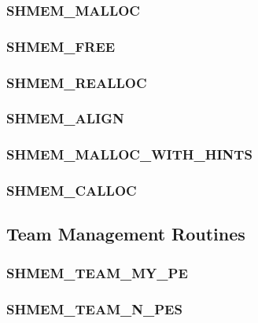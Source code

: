 \documentclass[10pt,oneside]{book}
\begin{document}
\subsubsection{\textbf{SHMEM\_MALLOC}}\label{subsec:shmem_malloc}


\subsubsection{\textbf{SHMEM\_FREE}}\label{subsec:shmem_free}


\subsubsection{\textbf{SHMEM\_REALLOC}}\label{subsec:shmem_realloc}


\subsubsection{\textbf{SHMEM\_ALIGN}}\label{subsec:shmem_align}


\subsubsection{\textbf{SHMEM\_MALLOC\_WITH\_HINTS}}\label{subsec:shmmallochint}


\subsubsection{\textbf{SHMEM\_CALLOC}}\label{subsec:shmem_calloc}




\subsection{Team Management Routines}\label{subsec:team}


\subsubsection{\textbf{SHMEM\_TEAM\_MY\_PE}}\label{subsec:shmem_team_my_pe}


\subsubsection{\textbf{SHMEM\_TEAM\_N\_PES}}\label{subsec:shmem_team_n_pes}

\end{document}
